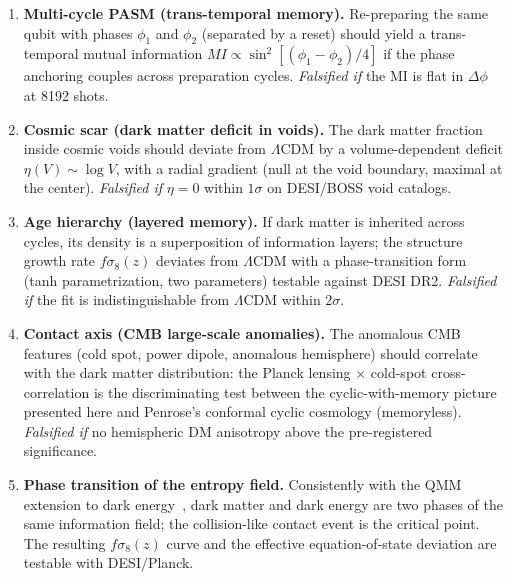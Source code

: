 \documentclass[12pt,a4paper]{article}
\begin{document}
\begin{enumerate}
    \item \textbf{Multi-cycle PASM (trans-temporal memory).} Re-preparing the same qubit with phases $\phi_1$ and $\phi_2$ (separated by a reset) should yield a trans-temporal mutual information $MI \propto \sin^2[(\phi_1-\phi_2)/4]$ if the phase anchoring couples across preparation cycles. \textit{Falsified if} the MI is flat in $\Delta\phi$ at 8192 shots.
    \item \textbf{Cosmic scar (dark matter deficit in voids).} The dark matter fraction inside cosmic voids should deviate from $\Lambda$CDM by a volume-dependent deficit $\eta(V) \sim \log V$, with a radial gradient (null at the void boundary, maximal at the center). \textit{Falsified if} $\eta = 0$ within $1\sigma$ on DESI/BOSS void catalogs.
    \item \textbf{Age hierarchy (layered memory).} If dark matter is inherited across cycles, its density is a superposition of information layers; the structure growth rate $f\sigma_8(z)$ deviates from $\Lambda$CDM with a phase-transition form (tanh parametrization, two parameters) testable against DESI DR2. \textit{Falsified if} the fit is indistinguishable from $\Lambda$CDM within $2\sigma$.
    \item \textbf{Contact axis (CMB large-scale anomalies).} The anomalous CMB features (cold spot, power dipole, anomalous hemisphere) should correlate with the dark matter distribution: the Planck lensing $\times$ cold-spot cross-correlation is the discriminating test between the cyclic-with-memory picture presented here and Penrose's conformal cyclic cosmology (memoryless). \textit{Falsified if} no hemispheric DM anisotropy above the pre-registered significance.
    \item \textbf{Phase transition of the entropy field.} Consistently with the QMM extension to dark energy~\cite{neukart2025de}, dark matter and dark energy are two phases of the same information field; the collision-like contact event is the critical point. The resulting $f\sigma_8(z)$ curve and the effective equation-of-state deviation are testable with DESI/Planck.
\end{enumerate}
\end{document}
